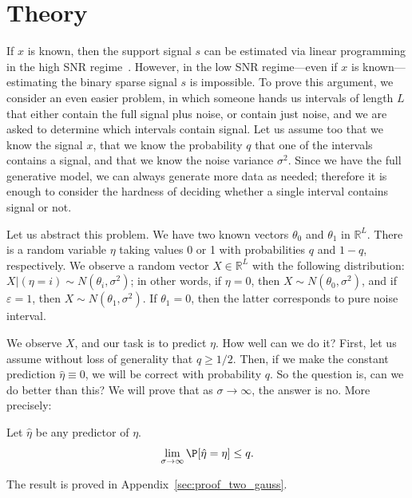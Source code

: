 \documentclass[9pt,twocolumn,twoside,lineno]{pnas-new}
\begin{document}

\section{Theory} \label{sec:theory}

If $x$ is known, then the support signal $s$ can be estimated via linear programming  in the high SNR regime~\cite{azais2015spike,denoyelle2017support,bendory2016robust,bendory2017robust}. 
However, in the low SNR regime---even if $x$ is known---estimating the binary sparse signal $s$ is impossible. 
To prove this argument, we consider an even easier problem, in which someone hands us intervals of length $L$ that either contain the full signal plus noise, or contain just noise, and we are asked to determine which intervals contain signal. 
Let us assume too that we know the signal $x$, that we know the probability $q$ that one of the intervals contains a signal, and that we know the noise variance $\sigma^2$. Since we have the full generative model, we can always generate more data as needed; therefore it is enough to consider the hardness of deciding whether a single interval contains signal or not.

Let us abstract this problem. We have two known vectors $\theta_0$ and $\theta_1$ in $\mathbb{R}^L$. There is a random variable $\eta$ taking values 0 or 1 with probabilities $q$ and $1-q$, respectively. We observe a random vector $X \in \mathbb{R}^L$ with the following distribution: $X | (\eta  = i) \sim N(\theta_i,\sigma^2)$; in other words, if $\eta = 0$, then $X \sim N(\theta_0,\sigma^2)$, and if $\varepsilon  = 1$, then $X \sim N(\theta_1,\sigma^2)$. If $\theta_1=0$, then the latter corresponds to pure noise interval.

We observe $X$, and our task is to predict $\eta$. How well can we do it? First, let us assume without loss of generality that $q \ge 1/2$. Then, if we make the constant prediction $\hat{\eta } \equiv 0$, we will be correct with probability $q$. So the question is, can we do better than this? We will prove that as $\sigma \to \infty$, the answer is no. More precisely:
\begin{proposition} \label{prop:two_gauss}
	Let $\hat{\eta }$ be any predictor of $\eta$.
	\begin{align*}
	\lim_{\sigma \to \infty} \P[ \hat{\eta} = \eta  ] \le q.
	\end{align*}
\end{proposition}
\noindent The result is proved in Appendix~\ref{sec:proof_two_gauss}.
\end{document}
